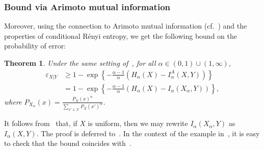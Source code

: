 \documentclass{article}
\newtheorem{theorem}{Theorem}
\numberwithin{theorem}{section}
\newtheorem{lemma}[theorem]{Lemma}
\numberwithin{example}{section}
\numberwithin{remark}{section}
\numberwithin{definition}{section}
\newcommand{\X}{\mathcal{X}}
\newcommand{\eps}{\varepsilon}
\newcommand{\ds}{\displaystyle}
\begin{document}

\subsubsection{Bound via Arimoto mutual information}
Moreover, using the connection to Arimoto mutual information (cf.~) and the properties of conditional R\'enyi entropy, we get the following bound on the probability of error:
\begin{theorem}
    \label{thm:fano-alpha-Arimoto}
    Under the same setting of~, for all $\alpha \in (0,1) \cup (1,\infty)$,
    \begin{align}
        \label{eq:thm-fano-alpha-Arimoto}
      \eps_{X|Y} 
      &\geq 1- \exp \left\lbrace -\frac{\alpha-1}{\alpha} \left( H_\alpha(X) - I^A_\alpha (X, Y) \right) \right\rbrace \\
      &= 1- \exp \left\lbrace -\frac{\alpha-1}{\alpha} \left( H_\alpha(X) - I_\alpha (X_\alpha, Y) \right) \right\rbrace,
    \end{align}
    where $ \ds P_{X_\alpha} (x) = \frac{P_X(x)^\alpha}{\sum_{x' \in \X} P_X(x')^\alpha} $.
\end{theorem}
It follows from~ that, if $X$ is uniform, then we may rewrite $I_\alpha(X_\alpha, Y)$ as $I_\alpha(X,Y)$. The proof is deferred to~. In the context of the example in~, it is easy to check that the bound coincides with~. 




\end{document}
